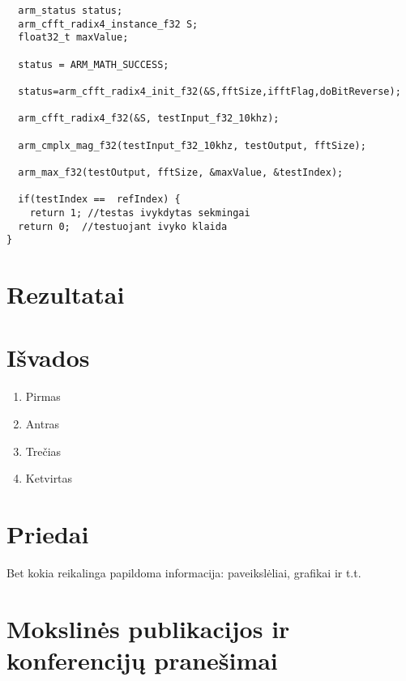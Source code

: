 \documentclass[a4paper, 12pt]{article} %
\begin{document}
\begin{onehalfspacing}
\begin{verbatim}
  arm_status status; 
  arm_cfft_radix4_instance_f32 S; 
  float32_t maxValue; 
   
  status = ARM_MATH_SUCCESS; 
   
  status=arm_cfft_radix4_init_f32(&S,fftSize,ifftFlag,doBitReverse); 
    
  arm_cfft_radix4_f32(&S, testInput_f32_10khz); 
    
  arm_cmplx_mag_f32(testInput_f32_10khz, testOutput, fftSize);  
   
  arm_max_f32(testOutput, fftSize, &maxValue, &testIndex); 
   
  if(testIndex ==  refIndex) { 
    return 1; //testas ivykdytas sekmingai
  return 0;  //testuojant ivyko klaida
} 
\end{verbatim}    
\newpage
   
\section{Rezultatai}
\section{I\v{s}vados}


\begin{enumerate}
\item Pirmas
\item Antras 
\item Tre\v{c}ias
\item Ketvirtas
\end{enumerate}

\newpage

\section{Priedai}

Bet kokia reikalinga papildoma informacija: paveiksl\.{e}liai, grafikai ir t.t.

\end{onehalfspacing}

\newpage

\section*{Mokslin\.{e}s publikacijos ir konferencij\k{u} prane\v{s}imai}

\end{document}
